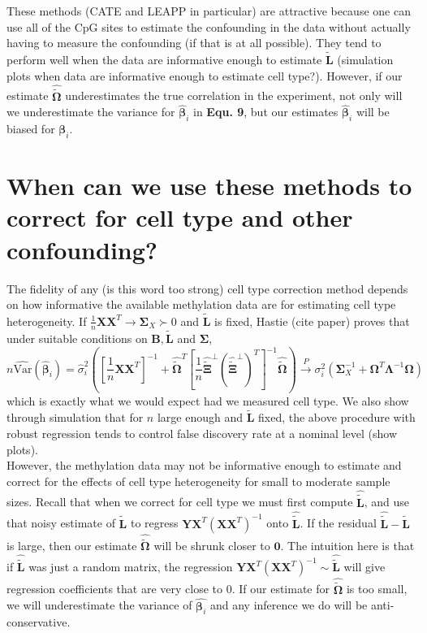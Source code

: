 \documentclass{article}
\begin{document}
\indent These methods (CATE and LEAPP in particular) are attractive because one can use all of the CpG sites to estimate the confounding in the data without actually having to measure the confounding (if that is at all possible). They tend to perform well when the data are informative enough to estimate $\bm{\tilde{L}}$ (simulation plots when data are informative enough to estimate cell type?). However, if our estimate $\hat{\tilde{\bm{\Omega}}}$ underestimates the true correlation in the experiment, not only will we underestimate the variance for $\hat{\bm{\beta}}_i$ in \textbf{Equ. 9}, but our estimates $\hat{\bm{\beta}}_i$ will be biased for $\bm{\beta}_i$.

\section{When can we use these methods to correct for cell type and other confounding?}
The fidelity of any (is this word too strong) cell type correction method depends on how informative the available methylation data are for estimating cell type heterogeneity. If $\frac{1}{n}\bm{X}\bm{X}^T \to \bm{\Sigma}_{X} \succ 0$ and $\bm{\tilde{L}}$ is fixed, Hastie (cite paper) proves that under suitable conditions on $\bm{B}, \bm{\tilde{L}}$ and $\bm{\Sigma}$,
\begin{equation}
n\hat{\text{Var}}\left( \hat{\bm{\beta}}_i \right) = \hat{\sigma}_i^2 \left( \left[ \frac{1}{n}\bm{X}\bm{X}^T \right]^{-1} + \hat{\tilde{\bm{\Omega}}}^T\left[ \frac{1}{n}\hat{\tilde{\bm{\Xi}}}^{\perp}\left( \hat{\tilde{\bm{\Xi}}}^{\perp} \right)^T \right]^{-1} \hat{\tilde{\bm{\Omega}}} \right) \stackrel{P}{\to} \sigma_i^2 \left( \bm{\Sigma}_X^{-1} + \bm{\Omega}^T \bm{\Lambda}^{-1} \bm{\Omega} \right)
\end{equation}
which is exactly what we would expect had we measured cell type. We also show through simulation that for $n$ large enough and $\bm{\tilde{L}}$ fixed, the above procedure with robust regression tends to control false discovery rate at a nominal level (show plots).\\
\indent However, the methylation data may not be informative enough to estimate and correct for the effects of cell type heterogeneity for small to moderate sample sizes. Recall that when we correct for cell type we must first compute $\hat{\bm{\tilde{L}}}$, and use that noisy estimate of $\bm{\tilde{L}}$ to regress $\bm{Y}\bm{X}^T \left( \bm{X}\bm{X}^T \right)^{-1}$ onto $\hat{\bm{\tilde{L}}}$. If the residual $\hat{\bm{\tilde{L}}} - \bm{\tilde{L}}$ is large, then our estimate $\hat{\tilde{\bm{\Omega}}}$ will be shrunk closer to $\bm{0}$. The intuition here is that if $\hat{\bm{\tilde{L}}}$ was just a random matrix, the regression $\bm{Y}\bm{X}^T \left( \bm{X}\bm{X}^T \right)^{-1} \sim \hat{\bm{\tilde{L}}}$ will give regression coefficients that are very close to 0. If our estimate for $\hat{\tilde{\bm{\Omega}}}$ is too small, we will underestimate the variance of $\hat{\bm{\beta}_i}$ and any inference we do will be anti-conservative.\\
\end{document}

